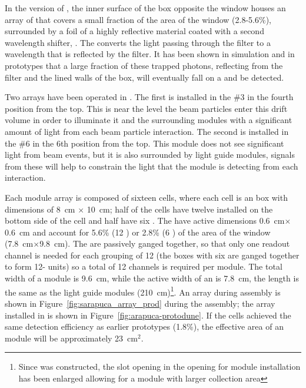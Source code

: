 In the  version of , the inner surface of the box opposite the window houses an array of  that covers a small fraction of the area of the window (2.8-5.6\%), surrounded by a foil of a highly reflective material coated with a second wavelength shifter, . The  converts the light passing through the filter to a wavelength that is reflected by the filter. It has been shown in simulation and in prototypes that a large fraction of these trapped photons, reflecting from the filter and the lined walls of the box, will eventually fall on a  and be detected.

Two  arrays have been operated in . The first is installed in the  \#3 in the fourth position from the top.  This is near the level the beam particles enter this drift volume in order to illuminate it and the surrounding modules with a significant amount of light from each beam particle interaction.
The second is installed in the  \#6 in the 6th position from the top.  This module does not see significant light from beam events, but it is also surrounded by light guide modules, signals from these will help to constrain the light that the module is detecting from each interaction.

Each   module array is composed of sixteen cells, where each cell is an  box with dimensions of \SI{8}{cm} $\times$ \SI{10}{cm}; half of the cells have twelve  installed on the bottom side of the cell and  half have six . The  have active dimensions \SI{0.6}{cm}$\times$\SI{0.6}{cm} and account for 5.6\% (\num{12} ) or \num{2.8}\% (\num{6} ) of the area of the window (\SI{7.8}{cm}$\times$\SI{9.8}{cm}).
The   are passively ganged together, so that only one readout channel is needed for each  grouping of \num{12}  (the boxes with six  are ganged together to form \num{12}- units) so a total of \num{12} channels is required per module. 
The total width of a module is \SI{9.6}{cm}, while the active width of an  is \SI{7.8}{cm}, the length is the same as the light guide modules (\SI{210}{cm})\footnote{Since  was constructed, the slot opening in the  opening for  module installation has been enlarged allowing for a module with larger collection area}.
An  array during assembly is shown in Figure~\ref{fig:sarapuca_array_prod} during the assembly; the array installed in  is shown in Figure~\ref{fig:arapuca-protodune}. If the  cells achieved the same detection efficiency as earlier prototypes (1.8\%), the effective area of an  module will be approximately \SI{23}{cm$^2$}.

